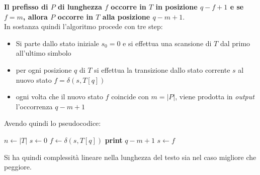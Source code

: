 \begin{center}
\end{center}
\textbf{Il prefisso di $P$ di lunghezza $f$ occorre in $T$ in posizione
  $q-f+1$ e se $f = m$, allora $P$ occorre in $T$ alla posizione $q-m+1$}.\\
In sostanza quindi l'algoritmo procede con tre step:
\begin{itemize}
  \item Si  parte dallo stato iniziale $s_0=0$  e si effettua una scansione di
  $T$ dal primo all’ultimo simbolo
  \item per ogni posizione $q$ di $T$ si effettua la transizione dallo stato
  corrente $s$ al nuovo stato $f = \delta(s,T[q])$ 
  \item ogni volta che il nuovo stato $f$ coincide con $m=|P|$, viene prodotta
  in \textit{output} l’occorrenza $q-m+1$  
\end{itemize}
Avendo quindi lo pseudocodice:
\begin{algorithm}
  \begin{algorithmic}
    \State $n\gets|T|$
    \State $s\gets 0$
    \State $f\gets \delta(s, T[q])$
    \State \textbf{print} $q-m+1$
    \EndIf
    \State $s\gets f$
    \EndFor
    \EndFunction
  \end{algorithmic}
\end{algorithm}
Si ha quindi complessità lineare nella lunghezza del testo sia nel caso migliore
che peggiore.

